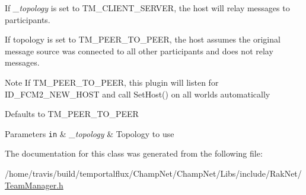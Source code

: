 If {\itshape \-\_\-topology} is set to T\-M\-\_\-\-C\-L\-I\-E\-N\-T\-\_\-\-S\-E\-R\-V\-E\-R, the host will relay messages to participants. 

If topology is set to T\-M\-\_\-\-P\-E\-E\-R\-\_\-\-T\-O\-\_\-\-P\-E\-E\-R, the host assumes the original message source was connected to all other participants and does not relay messages. \begin{DoxyNote}{Note}
If T\-M\-\_\-\-P\-E\-E\-R\-\_\-\-T\-O\-\_\-\-P\-E\-E\-R, this plugin will listen for I\-D\-\_\-\-F\-C\-M2\-\_\-\-N\-E\-W\-\_\-\-H\-O\-S\-T and call Set\-Host() on all worlds automatically 

Defaults to T\-M\-\_\-\-P\-E\-E\-R\-\_\-\-T\-O\-\_\-\-P\-E\-E\-R 
\end{DoxyNote}

\begin{DoxyParams}[1]{Parameters}
\mbox{\tt in}  & {\em \-\_\-topology} & Topology to use \\
\hline
\end{DoxyParams}


The documentation for this class was generated from the following file\-:\begin{DoxyCompactItemize}
\item 
/home/travis/build/temportalflux/\-Champ\-Net/\-Champ\-Net/\-Libs/include/\-Rak\-Net/\hyperlink{_team_manager_8h}{Team\-Manager.\-h}\end{DoxyCompactItemize}
